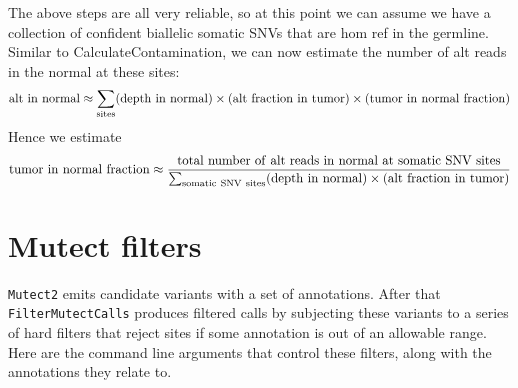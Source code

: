 \documentclass[nofootinbib,amssymb,amsmath]{revtex4}
\newcommand{\code}[1]{\texttt{#1}}
\begin{document}
The above steps are all very reliable, so at this point we can assume we have a collection of confident biallelic somatic SNVs that are hom ref in the germline.  Similar to CalculateContamination, we can now estimate the number of alt reads in the normal at these sites:
\begin{align}
{\rm alt~in~normal} \approx \sum_{\rm sites} ({\rm depth~in~normal}) \times ({\rm alt~fraction~in~tumor}) \times ({\rm tumor~in~normal~fraction})
\end{align}
Hence we estimate
\begin{align}
{\rm tumor~in~normal~fraction} \approx 
\frac{\rm total~number~of~alt~reads~in~normal~at~somatic~SNV~sites}
{\sum_{\rm somatic~SNV~sites} ({\rm depth~in~normal}) \times ({\rm alt~fraction~in~tumor})}
\end{align}

\section{Mutect filters}
\code{Mutect2} emits candidate variants with a set of annotations.  After that \code{FilterMutectCalls} produces filtered calls by subjecting these variants to a series of hard filters that reject sites if some annotation is out of an allowable range.  Here are the command line arguments that control these filters, along with the annotations they relate to.
\end{document}
